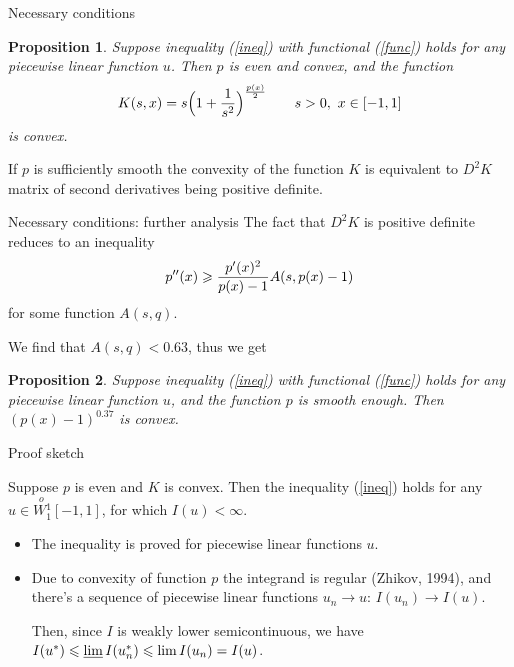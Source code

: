 \documentclass{beamer}\usepackage[]{graphicx}\usepackage[]{color}
\renewcommand{\ge}{\geqslant}
\renewcommand{\le}{\leqslant}
\newcommand{\Wf}{\stackrel{o\ }{W{}_1^1}}
\newtheorem{prop}{Proposition}
\begin{document}
\begin{frame}{Necessary conditions}

\begin{prop}
Suppose inequality (\ref{ineq}) with functional (\ref{func}) holds for any piecewise linear function $u$.
Then $p$ is even and convex,
and the function
$$K(s, x) = s \Big( 1 + { 1 \over s^2 } \Big)^{p(x) \over 2} \qquad s > 0,\ x \in [-1, 1]$$
is convex.
\end{prop}

If $p$ is sufficiently smooth the convexity of the function $K$ is equivalent to 
$D^2 K$ matrix of second derivatives being positive definite.

\end{frame}


\begin{frame}{Necessary conditions: further analysis}
The fact that $D^2 K$ is positive definite reduces to an inequality
$$p''(x) \ge {p'(x)^2 \over p(x) - 1} A(s, p(x) - 1)$$
for some function $A(s, q)$.

We find that $A(s, q) < 0.63$, thus we get
\begin{prop}
Suppose inequality (\ref{ineq}) with functional (\ref{func}) holds for any piecewise linear function $u$,
and the function $p$ is smooth enough.
Then $(p(x) - 1)^{0.37}$ is convex.
\end{prop}

\end{frame}


\begin{frame}{Proof sketch}

\begin{theorem}
Suppose $p$ is even and $K$ is convex.
Then the inequality (\ref{ineq}) holds for any $u \in \Wf[-1, 1]$, for which $I(u) < \infty$.
\end{theorem}

\begin{itemize}
\item The inequality is proved for piecewise linear functions $u$.

\item Due to convexity of function $p$ the integrand is regular (Zhikov, 1994),
and there's a sequence of piecewise linear functions $u_n \to u$: $I(u_n) \to I(u)$.

Then, since $I$ is weakly lower semicontinuous, we have $I(u^*) \le \varliminf I(u_n^*) \le \lim I(u_n) = I(u)$.
\end{itemize}

\end{frame}
\end{document}
